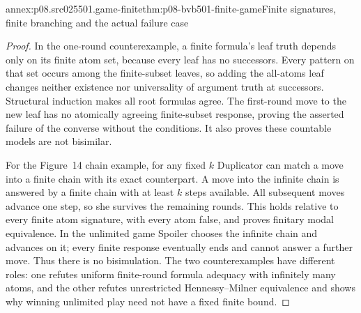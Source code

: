 \begin{annexitem}{annex:p08.src025501.game-finite}{thm:p08-bvb501-finite-game}{Finite signatures, finite branching and the actual failure case}
\begin{proof}
In the one-round counterexample, a finite formula's leaf truth depends
only on its finite atom set, because every leaf has no successors.
Every pattern on that set occurs among the finite-subset leaves, so adding
the all-atoms leaf changes neither existence nor universality of argument
truth at successors. Structural induction makes all root formulas agree.
The first-round move to the new leaf has no atomically agreeing finite-subset
response, proving the asserted failure of the converse without the
conditions. It also proves these countable models are not bisimilar.

For the Figure~14 chain example, for any fixed \(k\) Duplicator can
match a move into a finite chain with its exact counterpart. A move into
the infinite chain is answered by a finite chain with at least \(k\)
steps available. All subsequent moves advance one step, so she survives
the remaining rounds. This holds relative to every finite atom signature,
with every atom false, and proves finitary modal equivalence. In the
unlimited game Spoiler chooses the infinite chain and advances on it;
every finite response eventually ends and cannot answer a further move.
Thus there is no bisimulation. The two counterexamples have different
roles: one refutes uniform finite-round formula adequacy with infinitely
many atoms, and the other refutes unrestricted Hennessy--Milner equivalence
and shows why winning unlimited play need not have a fixed finite bound.
\end{proof}
\end{annexitem}

